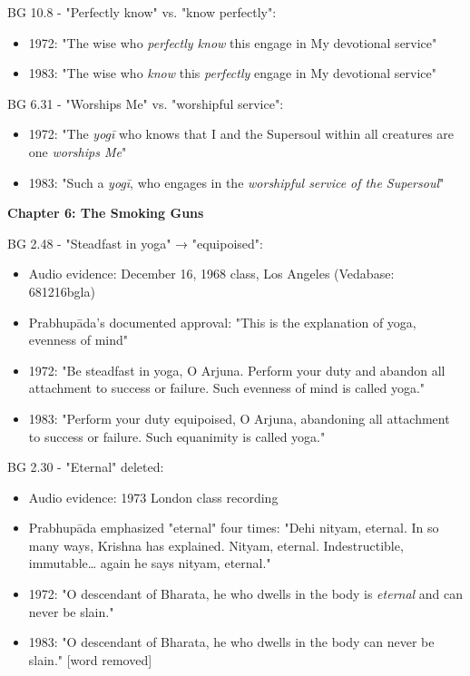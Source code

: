 \documentclass[12pt,twoside]{book}
\begin{document}
BG 10.8 - "Perfectly know" vs. "know perfectly":
\begin{itemize}
\item 1972: "The wise who \emph{perfectly know} this engage in My devotional service"
\item 1983: "The wise who \emph{know} this \emph{perfectly} engage in My devotional service"
\end{itemize}

BG 6.31 - "Worships Me" vs. "worshipful service":
\begin{itemize}
\item 1972: "The \emph{yogī} who knows that I and the Supersoul within all creatures are one \emph{worships Me}"
\item 1983: "Such a \emph{yogī}, who engages in the \emph{worshipful service of the Supersoul}"
\end{itemize}

\vspace{0.5cm}

\textbf{\textbf{Chapter 6: The Smoking Guns}}

BG 2.48 - "Steadfast in yoga" → "equipoised":
\begin{itemize}
\item Audio evidence: December 16, 1968 class, Los Angeles (Vedabase: 681216bgla)
\item Prabhupāda's documented approval: "This is the explanation of yoga, evenness of mind"
\item 1972: "Be steadfast in yoga, O Arjuna. Perform your duty and abandon all attachment to success or failure. Such evenness of mind is called yoga."
\item 1983: "Perform your duty equipoised, O Arjuna, abandoning all attachment to success or failure. Such equanimity is called yoga."
\end{itemize}

BG 2.30 - "Eternal" deleted:
\begin{itemize}
\item Audio evidence: 1973 London class recording
\item Prabhupāda emphasized "eternal" four times: "Dehi nityam, eternal. In so many ways, Krishna has explained. Nityam, eternal. Indestructible, immutable\ldots{} again he says nityam, eternal."
\item 1972: "O descendant of Bharata, he who dwells in the body is \emph{eternal} and can never be slain."
\item 1983: "O descendant of Bharata, he who dwells in the body can never be slain." [word removed]
\end{itemize}
\end{document}
